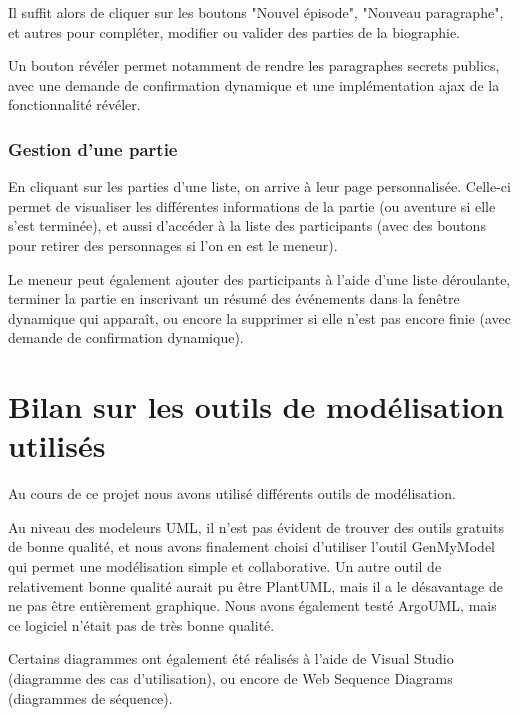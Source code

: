 \documentclass[a4paper, 11pt, titlepage]{article}
\begin{document}
Il suffit alors de cliquer sur les boutons "Nouvel épisode", "Nouveau paragraphe", et autres pour compléter, modifier ou valider des parties de la biographie.

Un bouton révéler permet notamment de rendre les paragraphes secrets publics, avec une demande de confirmation dynamique et une implémentation {\sc ajax} de la fonctionnalité révéler.


\subsubsection {Gestion d'une partie}

En cliquant sur les parties d'une liste, on arrive à leur page personnalisée. Celle-ci permet de visualiser les différentes informations de la partie (ou aventure si elle s'est terminée), et aussi d'accéder à la liste des participants (avec des boutons pour retirer des personnages si l'on en est le meneur).

Le meneur peut également ajouter des participants à l'aide d'une liste déroulante, terminer la partie en inscrivant un résumé des événements dans la fenêtre dynamique qui apparaît, ou encore la supprimer si elle n'est pas encore finie (avec demande de confirmation dynamique).





\section {Bilan sur les outils de modélisation utilisés}

Au cours de ce projet nous avons utilisé différents outils de modélisation.

Au niveau des modeleurs UML, il n'est pas évident de trouver des outils gratuits de bonne qualité, et nous avons finalement choisi d'utiliser l'outil GenMyModel qui permet une modélisation simple et collaborative. Un autre outil de relativement bonne qualité aurait pu être PlantUML, mais il a le désavantage de ne pas être entièrement graphique. Nous avons également testé ArgoUML, mais ce logiciel n'était pas de très bonne qualité.

Certains diagrammes ont également été réalisés à l'aide de Visual Studio (diagramme des cas d'utilisation), ou encore de Web Sequence Diagrams (diagrammes de séquence).
\end{document}
